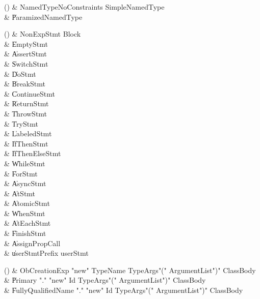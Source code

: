 \begin{bbgrammarappendix}{2.8in}

() & NamedTypeNoConstraints \label{prod:NamedTypeNoConstraints}  \: SimpleNamedType  \\

 &    \| ParamizedNamedType \\

\end{bbgrammarappendix}

\begin{bbgrammarappendix}{4.0in}

() & NonExpStmt \label{prod:NonExpStmt}  \: Block  \\

 &    \| EmptyStmt \\
 &    \| AssertStmt \\
 &    \| SwitchStmt \\
 &    \| DoStmt \\
 &    \| BreakStmt \\
 &    \| ContinueStmt \\
 &    \| ReturnStmt \\
 &    \| ThrowStmt \\
 &    \| TryStmt \\
 &    \| LabeledStmt \\
 &    \| IfThenStmt \\
 &    \| IfThenElseStmt \\
 &    \| WhileStmt \\
 &    \| ForStmt \\
 &    \| AsyncStmt \\
 &    \| AtStmt \\
 &    \| AtomicStmt \\
 &    \| WhenStmt \\
 &    \| AtEachStmt \\
 &    \| FinishStmt \\
 &    \| AssignPropCall \\
 &    \| userStmtPrefix userStmt \\

\end{bbgrammarappendix}

\begin{bbgrammarappendix}{3.7in}

() & ObCreationExp \label{prod:ObCreationExp}  \: \xcd"new" TypeName TypeArgs\opt \xcd"(" ArgumentList\opt \xcd")" ClassBody\opt  \\

 &    \| Primary \xcd"." \xcd"new" Id TypeArgs\opt \xcd"(" ArgumentList\opt \xcd")" ClassBody\opt \\
 &    \| FullyQualifiedName \xcd"." \xcd"new" Id TypeArgs\opt \xcd"(" ArgumentList\opt \xcd")" ClassBody\opt \\

\end{bbgrammarappendix}

